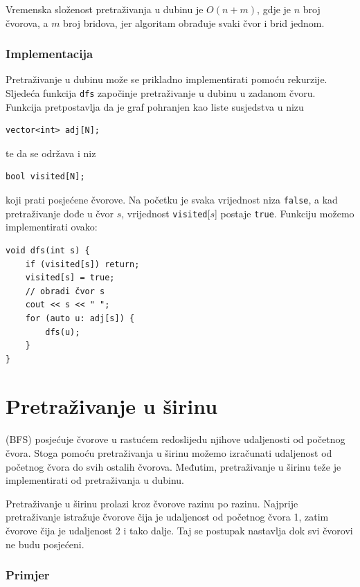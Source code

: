 Vremenska složenost pretraživanja u dubinu je $O(n+m)$,
gdje je $n$ broj čvorova, a $m$
broj bridova,
jer algoritam obrađuje svaki čvor i brid jednom.

\subsubsection*{Implementacija}

Pretraživanje u dubinu može se prikladno
implementirati pomoću rekurzije.
Sljedeća funkcija \texttt{dfs} započinje
pretraživanje u dubinu u zadanom čvoru.
Funkcija pretpostavlja da je graf
pohranjen kao liste susjedstva u nizu
\begin{lstlisting}
vector<int> adj[N];
\end{lstlisting}
te da se održava i niz
\begin{lstlisting}
bool visited[N];
\end{lstlisting}
koji prati posjećene čvorove.
Na početku je svaka vrijednost niza \texttt{false},
a kad pretraživanje dođe u čvor $s$,
vrijednost \texttt{visited}[$s$] postaje \texttt{true}.
Funkciju možemo implementirati ovako:
\begin{lstlisting}
void dfs(int s) {
    if (visited[s]) return;
    visited[s] = true;
    // obradi čvor s
    cout << s << " ";
    for (auto u: adj[s]) {
        dfs(u);
    }
}
\end{lstlisting}

\section{Pretraživanje u širinu}


 (BFS) posjećuje čvorove
u rastućem redoslijedu njihove udaljenosti
od početnog čvora.
Stoga pomoću pretraživanja u širinu možemo izračunati
udaljenost od početnog čvora do svih
ostalih čvorova.
Međutim, pretraživanje u širinu teže je
implementirati od pretraživanja u dubinu.

Pretraživanje u širinu prolazi kroz čvorove
razinu po razinu.
Najprije pretraživanje istražuje čvorove čija je
udaljenost od početnog čvora 1,
zatim čvorove čija je udaljenost 2 i tako dalje.
Taj se postupak nastavlja dok svi čvorovi
ne budu posjećeni.

\subsubsection*{Primjer}

